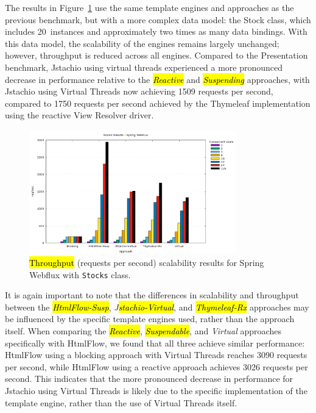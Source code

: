 \documentclass[software,article,accept,pdftex,moreauthors]{Definitions/mdpi}
\begin{document}
The results in Figure~\ref{fig:stocks-webflux-jmeter} use the same template
engines and approaches as the previous benchmark, but with a more complex data
model: the Stock class, which includes 20~instances and approximately two times
as many data bindings. With this data model, the scalability of the engines
remains largely unchanged; however, throughput is reduced across all engines.
Compared to the Presentation benchmark, Jstachio using virtual threads
experienced a more pronounced decrease in performance relative to the
\textit{\hl{Reactive}} and \textit{\hl{Suspending}} approaches, with Jstachio using
Virtual Threads now achieving 1509 requests per second, compared to 1750
requests per second achieved by the Thymeleaf implementation using the reactive
View Resolver driver.

\begin{figure}[H]
\vspace{-6pt}
     \includegraphics[width=0.8\textwidth]{./Graphs/stocks-webflux-jmeter.png}
     \caption{\hl{Throughput} %
 (requests per second) scalability results for Spring Webflux with \texttt{Stocks} class.}\label{fig:stocks-webflux-jmeter}
\end{figure}

It is again important to note that the differences in scalability and
throughput between the \textit{\hl{HtmlFlow-Susp}}, \textit{J\hl{stachio-Virtual}}, and
\textit{\hl{Thymeleaf-Rx}} approaches may be influenced by the specific template
engines used, rather than the approach itself. When comparing the
\textit{\hl{Reactive}}, \textit{\hl{Suspendable}}, and \textit{Virtual} approaches
specifically with HtmlFlow, we found that all three achieve similar
performance: HtmlFlow using a blocking approach with Virtual Threads reaches
3090 requests per second, while HtmlFlow using a reactive approach achieves
3026 requests per second. This indicates that the more pronounced decrease in
performance for Jstachio using Virtual Threads is likely due to the specific
implementation of the template engine, rather than the use of Virtual Threads
itself.
\end{document}
